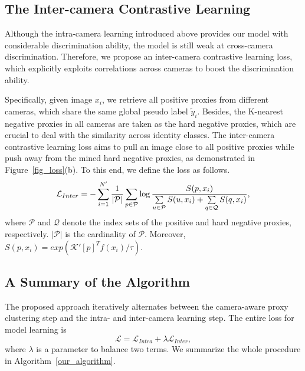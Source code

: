 \documentclass[letterpaper]{article} %
\begin{document}
\subsection{The Inter-camera Contrastive Learning}
Although the intra-camera learning introduced above provides our model with considerable discrimination ability, the model is still weak at cross-camera discrimination. Therefore, we propose an inter-camera contrastive learning loss, which explicitly exploits correlations across cameras to boost the discrimination ability.


Specifically, given image $x_i$, we retrieve all positive proxies from different cameras, which share the same global pseudo label $\tilde{y}_i$. Besides, the K-nearest negative proxies in all cameras are taken as the hard negative proxies, which are crucial to deal with the similarity across identity classes. The inter-camera contrastive learning loss aims to pull an image close to all positive proxies while push away from the mined hard negative proxies, as demonstrated in Figure~\ref{fig_loss}(b). To this end, we define the loss as follows.
\begin{equation}
\small
\mathcal{L}_{Inter}=-\sum_{i=1}^{N'}\frac{1}{|\mathcal{P}|}\sum_{p \in \mathcal{P}} \log \frac{S(p, x_i)}{\sum \limits_{u \in \mathcal{P}} S(u, x_i) + \sum \limits_{q \in \mathcal{Q}} S(q, x_i)},
\label{eq_global_loss}
\end{equation}
where $\mathcal{P}$ and $\mathcal{Q}$ denote the index sets of the positive and hard negative proxies, respectively. $|\mathcal{P}|$ is the cardinality of $\mathcal{P}$. Moreover, $S(p, x_i) = exp (\mathcal{K}'[p]^T f(x_i) / \tau)$.





\subsection{A Summary of the Algorithm}
The proposed approach iteratively alternates between the camera-aware proxy clustering step and the intra- and inter-camera learning step. The entire loss for model learning is
\begin{equation}
\mathcal{L} = \mathcal{L}_{Intra} + \lambda \mathcal{L}_{Inter},
\label{eq_overall_loss}
\end{equation}
where $\lambda$ is a parameter to balance two terms. We summarize the whole procedure in Algorithm~\ref{our_algorithm}.
\end{document}
